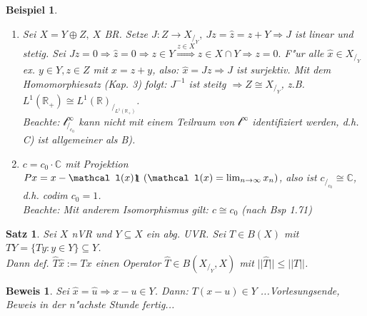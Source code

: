 \documentclass[a4paper,11pt]{book}
\newcommand{\R}{{\mathbb R}}
\newcommand{\C}{{\mathbb C}}
\newcommand{\ssl}{{\mathcal l}}
\newcommand{\id}{1\hspace{-0,9ex}\raisebox{-0,2ex}{1}}
\newtheorem{Sa}[Def]{Satz}
\newtheorem{Bsp}[Def]{Beispiel}
\theoremstyle{nonumberplain}
\newtheorem{Bew}[Def]{Beweis}
\begin{document}
\begin{Bsp}
\begin{enumerate}
\item[a)] Sei $X = Y \oplus Z,\ X$ BR. Setze $J: Z \rightarrow X_{/_Y},\ Jz = \hat{z} = z+Y \Rightarrow J$ ist linear und stetig. Sei $Jz = 0 \Rightarrow \hat{z} = 0 \Rightarrow z \in Y \stackrel{z \in X}{\Rightarrow} z \in X \cap Y \Rightarrow z = 0.$ F"ur alle $\hat{x} \in X_{/_Y}$ ex. $y \in Y, z \in Z$ mit $x = z+y$, also: $\hat{x} = Jz \Rightarrow J$ ist surjektiv. Mit dem Homomorphiesatz (Kap. 3) folgt: $J^{-1}$ ist steitg $\Rightarrow Z \cong X_{/_Y}$, z.B. $L^1(\R_+) \cong L^1(\R)_{/_{L^1(\R_+)}}$.\\
Beachte: $\ssl_{/_{c_0}}^{\infty}$ kann nicht mit einem Teilraum von $\ssl^{\infty}$ identifiziert werden, d.h. C) ist allgemeiner als B).

\item[b)] $c = c_0 \cdot \C$ mit Projektion $Px = x - \ssl(x) \id \ (\ssl(x)=\lim_{n \rightarrow \infty} x_n)$, also ist $c_{/_{c_0}} \cong \C$, d.h. codim $c_0 = 1$.\\
Beachte: Mit anderem Isomorphismus gilt: $c \cong c_0$ (nach Bsp 1.71)
\end{enumerate}
\end{Bsp}

\begin{Sa}
Sei $X$ nVR und $Y \subseteq X$ ein abg. UVR. Sei $T \in B(X)$ mit $TY = \{ Ty: y \in Y \} \subseteq Y$.\\
Dann def. $\hat{T} \hat{x} := Tx$ einen Operator $\hat{T} \in B(X_{/_Y},X)$ mit $||\hat{T}|| \leq ||T||$.
\end{Sa}

\begin{Bew}
Sei $\hat{x} = \hat{u} \Rightarrow x-u \in Y$. Dann: $T(x-u) \in Y$
...Vorlesungsende, Beweis in der n"achste Stunde fertig...
\end{Bew}
\end{document}
